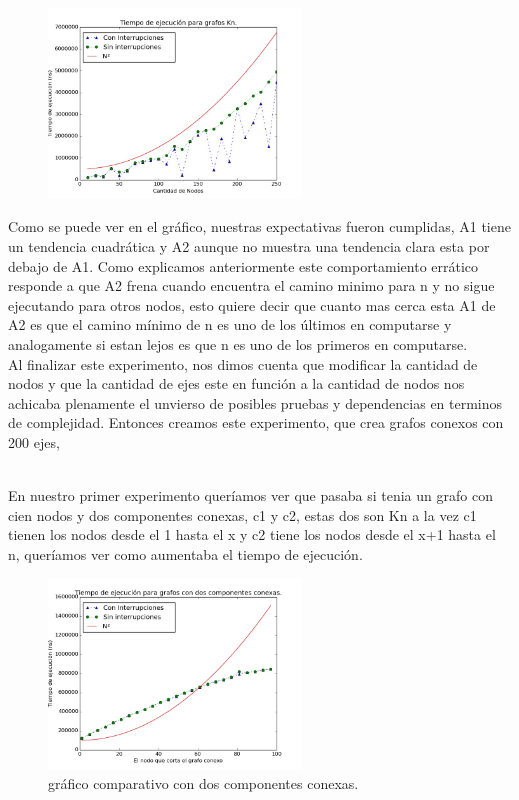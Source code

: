 \documentclass[spanish,12pt]{article}
\begin{document}
\begin{figure}[H]
\centering
\includegraphics[width=0.6\textwidth]{KnC100r3000}
\end{figure}

Como se puede ver en el gráfico, nuestras expectativas fueron cumplidas, A1 tiene un tendencia cuadrática y A2 aunque no muestra una tendencia clara esta por debajo de A1. Como explicamos anteriormente este comportamiento errático responde a que A2 frena cuando encuentra el camino minimo para n y no sigue ejecutando para otros nodos, esto quiere decir que cuanto mas cerca esta A1 de A2 es que el camino mínimo de n es uno de los últimos en computarse y analogamente si estan lejos es que n es uno de los primeros en computarse.
\\

Al finalizar este experimento, nos dimos cuenta que modificar la cantidad de nodos y que la cantidad de ejes este en función a la cantidad de nodos nos achicaba plenamente el unvierso de posibles pruebas y dependencias en terminos de complejidad. Entonces creamos este experimento, que crea grafos conexos con 200 ejes,

\\
En nuestro primer experimento queríamos ver que pasaba si tenia un grafo con cien nodos y dos componentes conexas, c1 y c2, estas dos son Kn a la vez c1 tienen los nodos desde el 1 hasta el x y c2 tiene los nodos desde el x+1 hasta el n, queríamos ver como aumentaba el tiempo de ejecución.

\begin{figure}[H]
\centering
\includegraphics[width=0.6\textwidth]{CompConexC150r3000}
\caption{gráfico comparativo con dos componentes conexas.}
\end{figure}
\end{document}
